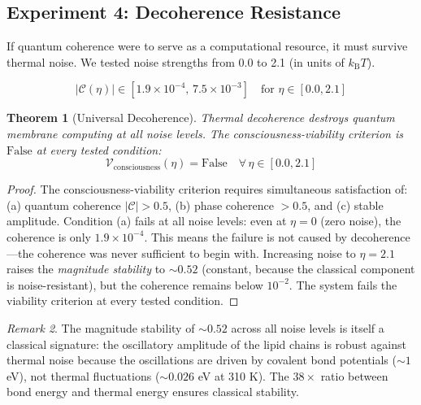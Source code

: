 \documentclass[twocolumn,10pt,a4paper]{article}
\newtheorem{theorem}{Theorem}[section]
\theoremstyle{definition}
\theoremstyle{remark}
\newtheorem{remark}[theorem]{Remark}
\newcommand{\kB}{k_{\mathrm{B}}}
\begin{document}
\subsection{Experiment 4: Decoherence Resistance}

If quantum coherence were to serve as a computational resource, it must survive thermal noise. We tested noise strengths from 0.0 to 2.1 (in units of $\kB T$).

\begin{equation}
\label{eq:decoherence_data}
|\mathcal{C}(\eta)| \in [1.9 \times 10^{-4}, \, 7.5 \times 10^{-3}] \quad \text{for } \eta \in [0.0, 2.1]
\end{equation}

\begin{theorem}[Universal Decoherence]
\label{thm:decoherence}
Thermal decoherence destroys quantum membrane computing at all noise levels. The consciousness-viability criterion is $\text{False}$ at every tested condition:
\begin{equation}
\label{eq:decoherence_fail}
\mathcal{V}_{\mathrm{consciousness}}(\eta) = \text{False} \quad \forall \, \eta \in [0.0, 2.1]
\end{equation}
\end{theorem}

\begin{proof}
The consciousness-viability criterion requires simultaneous satisfaction of: (a) quantum coherence $|\mathcal{C}| > 0.5$, (b) phase coherence $> 0.5$, and (c) stable amplitude. Condition (a) fails at all noise levels: even at $\eta = 0$ (zero noise), the coherence is only $1.9 \times 10^{-4}$. This means the failure is not caused by decoherence---the coherence was never sufficient to begin with. Increasing noise to $\eta = 2.1$ raises the \emph{magnitude stability} to $\sim 0.52$ (constant, because the classical component is noise-resistant), but the coherence remains below $10^{-2}$. The system fails the viability criterion at every tested condition. \qedhere
\end{proof}

\begin{remark}
The magnitude stability of $\sim 0.52$ across all noise levels is itself a classical signature: the oscillatory amplitude of the lipid chains is robust against thermal noise because the oscillations are driven by covalent bond potentials ($\sim 1$ eV), not thermal fluctuations ($\sim 0.026$ eV at 310 K). The $38\times$ ratio between bond energy and thermal energy ensures classical stability.
\end{remark}
\end{document}
